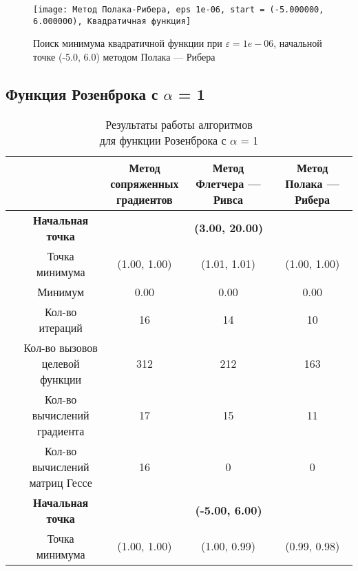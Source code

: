             \begin{figure}[H]
	        \centering
	        \texttt{[image: Метод Полака-Рибера, eps 1e-06, start = (-5.000000, 6.000000), Квадратичная функция]}%
	        \caption{Поиск минимума квадратичной функции при $\varepsilon = 1e-06$, начальной точке (-5.0, 6.0) методом Полака --- Рибера}
	        \vspace*{-1.2cm}
            \end{figure}
            \subsection{Функция Розенброка с $\alpha$ = 1}

\begin{table}[H]
        \centering
        \vspace*{-1.5em}
        \caption{Результаты работы алгоритмов\\для функции Розенброка с $\alpha$ = 1}
        \footnotesize
        \begin{tabular}{|c|c|c|c|c|}
        \hline
        & &\makecell{Метод\\сопряженных\\градиентов} &\makecell{Метод\\Флетчера --- Ривса} &\makecell{Метод\\Полака --- Рибера} \\
        \hline
	\multirow{12}{*}{\rotatebox[origin=c]{90}{$\varepsilon = 0.01$}}&\textbf{Начальная точка} &\multicolumn{3}{c|}{\textbf{(3.00, 20.00)}}\\
	\cline{2-5}
	&Точка минимума &(1.00, 1.00) &(1.01, 1.01) &(1.00, 1.00) \\ 
	\cline{2-5}
	&Минимум &0.00 &0.00 &0.00 \\ 
	\cline{2-5}
	&Кол-во итераций &16 &14 &10 \\ 
	\cline{2-5}
	&\makecell{Кол-во вызовов\\целевой функции} &312 &212 &163 \\ 
	\cline{2-5}
	&\makecell{Кол-во вычислений\\градиента} &17 &15 &11 \\ 
	\cline{2-5}
	&\makecell{Кол-во вычислений\\матриц Гессе} &16 &0 &0 \\ 
	\cline{2-5}
\cline{2-5}&\textbf{Начальная точка} &\multicolumn{3}{c|}{\textbf{(-5.00, 6.00)}}\\
	\cline{2-5}
	&Точка минимума &(1.00, 1.00) &(1.00, 0.99) &(0.99, 0.98) \\ 

\end{tabular}
\end{table}
